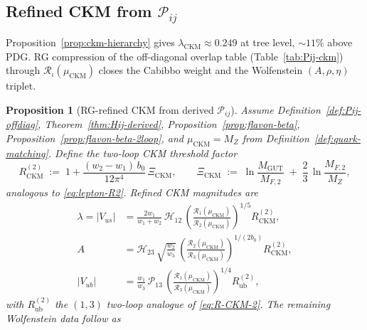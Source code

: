 \documentclass[aps,prd,onecolumn,amsmath,amssymb,nofootinbib,11pt]{revtex4-2}
\numberwithin{equation}{section}
\theoremstyle{plain}
\newtheorem{proposition}[theorem]{Proposition}
\theoremstyle{definition}
\theoremstyle{remark}
\begin{document}
\subsection{Refined CKM from $\mathcal{P}_{ij}$}
\label{sec:quark-precision:ckm}

Proposition~\ref{prop:ckm-hierarchy} gives
$\lambda_{\mathrm{CKM}}\approx0.249$ at tree level, $\sim11\%$ above PDG.
RG compression of the off-diagonal overlap table
(Table~\ref{tab:Pij-ckm}) through $\mathcal{R}_\iota(\mu_{\mathrm{CKM}})$
closes the Cabibbo weight and the Wolfenstein $(A,\rho,\eta)$ triplet.

\begin{proposition}[RG-refined CKM from derived $\mathcal{P}_{ij}$]
\label{prop:ckm-precision}
Assume Definition~\ref{def:Pij-offdiag}, Theorem~\ref{thm:Hij-derived},
Proposition~\ref{prop:flavon-beta}, Proposition~\ref{prop:flavon-beta-2loop},
and $\mu_{\mathrm{CKM}}=M_Z$ from Definition~\ref{def:quark-matching}.
Define the two-loop CKM threshold factor
\begin{equation}\label{eq:R-CKM-2}
  R_{\mathrm{CKM}}^{(2)}
  \;:=\;
  1 + \frac{(w_2-w_1)\,b_0}{12\pi^4}\,\Xi_{\mathrm{CKM}},
  \qquad
  \Xi_{\mathrm{CKM}}
  \;:=\;
  \ln\!\frac{M_{\mathrm{GUT}}}{M_{F,2}}
  \;+\;
  \frac{2}{3}\,\ln\!\frac{M_{F,2}}{M_Z},
\end{equation}
analogous to \eqref{eq:lepton-R2}. Refined CKM magnitudes are
\begin{align}
  \lambda = |V_{us}|
  &=
  \frac{2w_1}{w_1+w_2}\,\mathcal{H}_{12}\,
  \left(
    \frac{\mathcal{R}_1(\mu_{\mathrm{CKM}})}
         {\mathcal{R}_2(\mu_{\mathrm{CKM}})}
  \right)^{\!1/5}
  R_{\mathrm{CKM}}^{(2)},
  \label{eq:lambda-refined}\\
  A
  &=
  \mathcal{H}_{23}\,
  \sqrt{\frac{w_2}{w_3}}\,
  \left(
    \frac{\mathcal{R}_2(\mu_{\mathrm{CKM}})}
         {\mathcal{R}_3(\mu_{\mathrm{CKM}})}
  \right)^{\!1/(2b_0)}
  R_{\mathrm{CKM}}^{(2)},
  \label{eq:A-refined}\\
  |V_{ub}|
  &=
  \frac{w_1}{w_3}\,\mathcal{P}_{13}\,
  \left(
    \frac{\mathcal{R}_1(\mu_{\mathrm{CKM}})}
         {\mathcal{R}_3(\mu_{\mathrm{CKM}})}
  \right)^{\!1/4}
  R_{\mathrm{ub}}^{(2)},
  \label{eq:Vub-refined}
\end{align}
with $R_{\mathrm{ub}}^{(2)}$ the $(1,3)$ two-loop analogue of
\eqref{eq:R-CKM-2}. The remaining Wolfenstein data follow as
\begin{equation}\label{eq:wolfenstein-from-V}

\end{equation}
\end{proposition}
\end{document}
